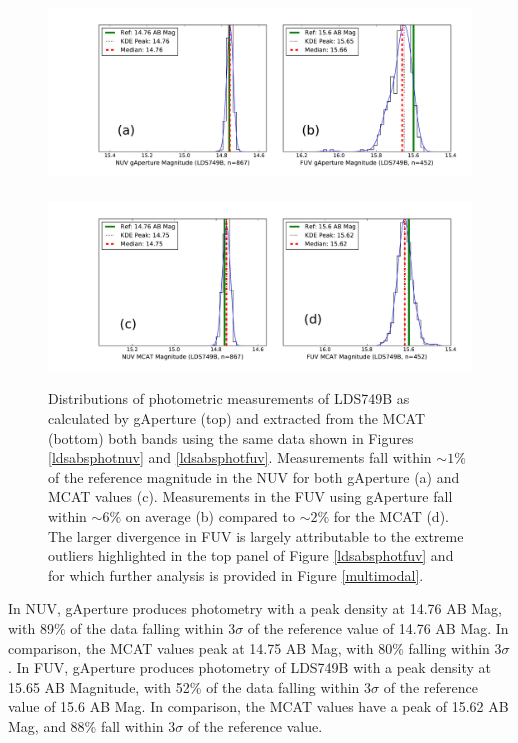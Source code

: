 \documentclass[preprint]{aastex}
\begin{document}
\begin{figure}[h]
\includegraphics[scale=0.55]{Fig08a.pdf}\\\\
\includegraphics[scale=0.55]{Fig08b.pdf}
\caption{Distributions of photometric measurements of LDS749B as calculated by gAperture (top) and extracted from the MCAT (bottom) both bands using the same data shown in Figures \ref{ldsabsphotnuv} and \ref{ldsabsphotfuv}. Measurements fall within $\sim1\%$ of the reference magnitude in the NUV for both gAperture (a) and MCAT values (c). Measurements in the FUV using gAperture fall within $\sim6\%$ on average (b) compared to $\sim2\%$ for the MCAT (d). The larger divergence in FUV is largely attributable to the extreme outliers highlighted in the top panel of Figure \ref{ldsabsphotfuv} and for which further analysis is provided in Figure \ref{multimodal}.
\label{magdist}}
\end{figure}
\clearpage

In NUV, gAperture produces photometry with a peak density at 14.76 AB Mag, with 89\% of the data falling within 3$\sigma$ of the reference value of 14.76 AB Mag. In comparison, the MCAT values peak at 14.75 AB Mag, with 80\% falling within 3$\sigma$. In FUV, gAperture produces photometry of LDS749B with a peak density at 15.65 AB Magnitude, with 52\% of the data falling within 3$\sigma$ of the reference value of 15.6 AB Mag. In comparison, the MCAT values have a peak of 15.62 AB Mag, and 88\% fall within 3$\sigma$ of the reference value.
\end{document}
